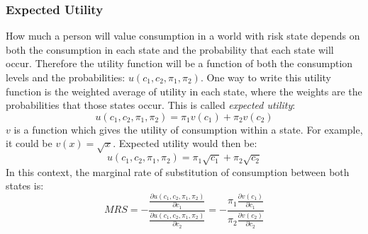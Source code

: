\documentclass{article}
\begin{document}
\subsubsection*{Expected Utility}
How much a person will value consumption in a world with risk state depends on both the consumption in each state and the probability that each state will occur. Therefore the utility function will be a function of both the consumption levels and the probabilities: $u\left( c_1,c_2,\pi_1,\pi_2 \right)$. One way to write this utility function is the weighted average of utility in each state, where the weights are the probabilities that those states occur. This is called \emph{expected utility}:
\begin{equation*}
  u\left( c_1,c_2,\pi_1,\pi_2 \right)= \pi_1 v\left( c_1 \right) + \pi_2 v\left( c_2 \right)
\end{equation*}
$v$ is a function which gives the utility of consumption within a state. For example, it could be $v\left( x \right)=\sqrt{x}$. Expected utility would then be:
\begin{equation*}
  u\left( c_1,c_2,\pi_1,\pi_2 \right)= \pi_1 \sqrt{c_1} + \pi_2 \sqrt{c_2}
\end{equation*}
In this context, the marginal rate of substitution of consumption between both states is:
\[
  MRS = -\frac{\frac{\partial u\left(c_1,c_2,\pi_1,\pi_2\right)}{\partial c_1}}
              {\frac{\partial u\left(c_1,c_2,\pi_1,\pi_2\right)}{\partial c_2}}
  = -\frac{\pi_1\frac{\partial v\left(c_1\right)}{\partial c_1}}
          {\pi_2\frac{\partial v\left(c_2\right)}{\partial c_2}}
\]
\end{document}
